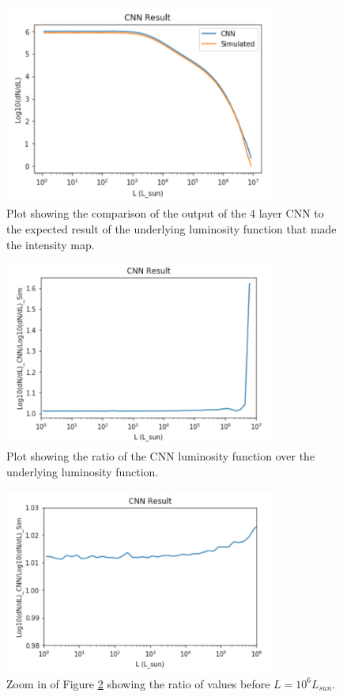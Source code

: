 \documentclass{article}
\begin{document}
			\begin{figure}[H]
				\centering 
				\includegraphics[width=0.8\textwidth]{CNN_4_layer_log.pdf}
				\caption{Plot showing the comparison of the output of the 4 layer CNN to the expected result of the underlying luminosity function that made the intensity map.}
				\label{fig:CNN_4_layer_log}
			\end{figure}

			\begin{figure}[H]
				\centering
				\includegraphics[width=0.8\textwidth]{CNN_4_layer_log_ratio.pdf}
				\caption{Plot showing the ratio of the CNN luminosity function over the underlying luminosity function.}
				\label{fig:CNN_4_layer_log_ratio}
			\end{figure}

			\begin{figure}[H]
				\centering
				\includegraphics[width=0.8\textwidth]{CNN_4_layer_log_ratio_small.pdf}
				\caption{Zoom in of Figure \ref{fig:CNN_4_layer_log_ratio} showing the ratio of values before \(L = 10^6 L_{sun}\).}
				\label{fig:CNN_4_layer_log_ratio_small}
			\end{figure}
\end{document}
